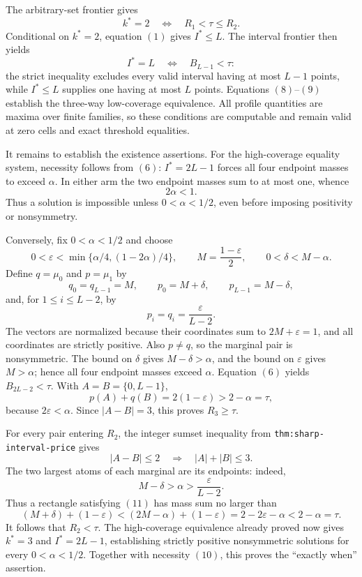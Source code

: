 The arbitrary-set frontier gives
\[
k^*=2
\quad\Longleftrightarrow\quad
R_1<\tau\leq R_2.
\tag{8}
\]
Conditional on \(k^*=2\), equation \((1)\) gives \(I^*\leq L\).  The interval frontier then yields
\[
I^*=L
\quad\Longleftrightarrow\quad
B_{L-1}<\tau:
\tag{9}
\]
the strict inequality excludes every valid interval having at most \(L-1\) points, while \(I^*\leq L\) supplies one having at most \(L\) points.  Equations \((8)\)--\((9)\) establish the three-way low-coverage equivalence.  All profile quantities are maxima over finite families, so these conditions are computable and remain valid at zero cells and exact threshold equalities.

It remains to establish the existence assertions.  For the high-coverage equality system, necessity follows from \((6)\): \(I^*=2L-1\) forces all four endpoint masses to exceed \(\alpha\).  In either arm the two endpoint masses sum to at most one, whence
\[
2\alpha<1.
\tag{10}
\]
Thus a solution is impossible unless \(0<\alpha<1/2\), even before imposing positivity or nonsymmetry.

Conversely, fix \(0<\alpha<1/2\) and choose
\[
0<\varepsilon<\min\{\alpha/4,(1-2\alpha)/4\},
\qquad
M=\frac{1-\varepsilon}{2},
\qquad
0<\delta<M-\alpha.
\]
Define \(q=\mu_0\) and \(p=\mu_1\) by
\[
q_0=q_{L-1}=M,
\qquad
p_0=M+\delta,
\qquad
p_{L-1}=M-\delta,
\]
and, for \(1\leq i\leq L-2\), by
\[
p_i=q_i=\frac{\varepsilon}{L-2}.
\]
The vectors are normalized because their coordinates sum to \(2M+\varepsilon=1\), and all coordinates are strictly positive.  Also \(p\neq q\), so the marginal pair is nonsymmetric.  The bound on \(\delta\) gives \(M-\delta>\alpha\), and the bound on \(\varepsilon\) gives \(M>\alpha\); hence all four endpoint masses exceed \(\alpha\).  Equation \((6)\) yields \(B_{2L-2}<\tau\).  With \(A=B=\{0,L-1\}\),
\[
p(A)+q(B)=2(1-\varepsilon)>2-\alpha=\tau,
\]
because \(2\varepsilon<\alpha\).  Since \(|A-B|=3\), this proves \(R_3\geq\tau\).

For every pair entering \(R_2\), the integer sumset inequality from \texttt{thm:sharp-interval-price} gives
\[
|A-B|\leq2
\quad\Longrightarrow\quad
|A|+|B|\leq3.
\tag{11}
\]
The two largest atoms of each marginal are its endpoints: indeed,
\[
M-\delta>\alpha>\frac{\varepsilon}{L-2}.
\]
Thus a rectangle satisfying \((11)\) has mass sum no larger than
\[
(M+\delta)+(1-\varepsilon)
<(2M-\alpha)+(1-\varepsilon)
=2-2\varepsilon-\alpha
<2-\alpha=\tau.
\tag{12}
\]
It follows that \(R_2<\tau\).  The high-coverage equivalence already proved now gives \(k^*=3\) and \(I^*=2L-1\), establishing strictly positive nonsymmetric solutions for every \(0<\alpha<1/2\).  Together with necessity \((10)\), this proves the ``exactly when'' assertion.

